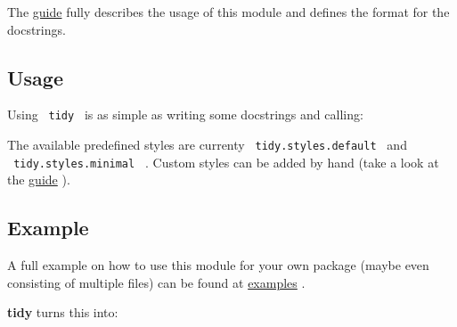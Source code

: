 The
\href{https://github.com/Mc-Zen/tidy/releases/download/v0.3.0/tidy-guide.pdf}{guide}
fully describes the usage of this module and defines the format for the
docstrings.

\subsection{Usage}\label{usage}

Using \texttt{\ tidy\ } is as simple as writing some docstrings and
calling:

\begin{Shaded}
\begin{Highlighting}[]

\end{Highlighting}
\end{Shaded}

The available predefined styles are currenty
\texttt{\ tidy.styles.default\ } and \texttt{\ tidy.styles.minimal\ } .
Custom styles can be added by hand (take a look at the
\href{https://github.com/Mc-Zen/tidy/releases/download/v0.3.0/tidy-guide.pdf}{guide}
).

\subsection{Example}\label{example}

A full example on how to use this module for your own package (maybe
even consisting of multiple files) can be found at
\href{https://github.com/Mc-Zen/tidy/tree/main/examples}{examples} .

\begin{Shaded}
\begin{Highlighting}[]
\NormalTok{///}
\NormalTok{///}
\end{Highlighting}
\end{Shaded}

\textbf{tidy} turns this into:

\subsubsection{\texorpdfstring{\protect\pandocbounded{}}{Tidy example output}}\label{tidy-example-output}


